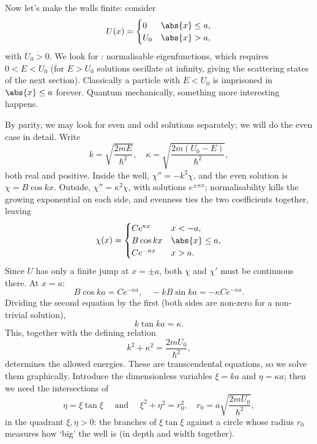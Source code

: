 Now let's make the walls finite: consider
$$
U(x) = \begin{cases}
    0 & \abs{x} \leq a, \\
    U_0 & \abs{x} > a,
\end{cases}
$$
with $U_0 > 0$. We look for : normalisable eigenfunctions, which requires $0 < E < U_0$ (for $E > U_0$ solutions oscillate at infinity, giving the scattering states of the next section). Classically a particle with $E < U_0$ is imprisoned in $\abs{x} \leq a$ forever. Quantum mechanically, something more interesting happens.

By parity, we may look for even and odd solutions separately; we will do the even case in detail. Write
$$
k = \sqrt{\frac{2mE}{\hbar^2}}, \quad \kappa = \sqrt{\frac{2m(U_0 - E)}{\hbar^2}},
$$
both real and positive. Inside the well, $\chi'' = -k^2 \chi$, and the even solution is $\chi = B\cos kx$. Outside, $\chi'' = \kappa^2 \chi$, with solutions $e^{\pm \kappa x}$; normalisability kills the growing exponential on each side, and evenness ties the two coefficients together, leaving
$$
\chi(x) = \begin{cases}
    C e^{\kappa x} & x < -a, \\
    B \cos kx & \abs{x} \leq a, \\
    C e^{-\kappa x} & x > a.
\end{cases}
$$
Since $U$ has only a finite jump at $x = \pm a$, both $\chi$ and $\chi'$ must be continuous there. At $x = a$:
$$
B \cos ka = C e^{-\kappa a}, \quad -kB\sin ka = -\kappa C e^{-\kappa a}.
$$
Dividing the second equation by the first (both sides are non-zero for a non-trivial solution),
$$
k \tan ka = \kappa.
$$
This, together with the defining relation
$$
k^2 + \kappa^2 = \frac{2 m U_0}{\hbar^2},
$$
determines the allowed energies. These are transcendental equations, so we solve them graphically. Introduce the dimensionless variables $\xi = ka$ and $\eta = \kappa a$; then we need the intersections of
$$
\eta = \xi \tan \xi \quad \text{ and } \quad \xi^2 + \eta^2 = r_0^2, \quad r_0 = a\sqrt{\frac{2 m U_0}{\hbar^2}},
$$
in the quadrant $\xi, \eta > 0$: the branches of $\xi \tan \xi$ against a circle whose radius $r_0$ measures how `big' the well is (in depth and width together).

